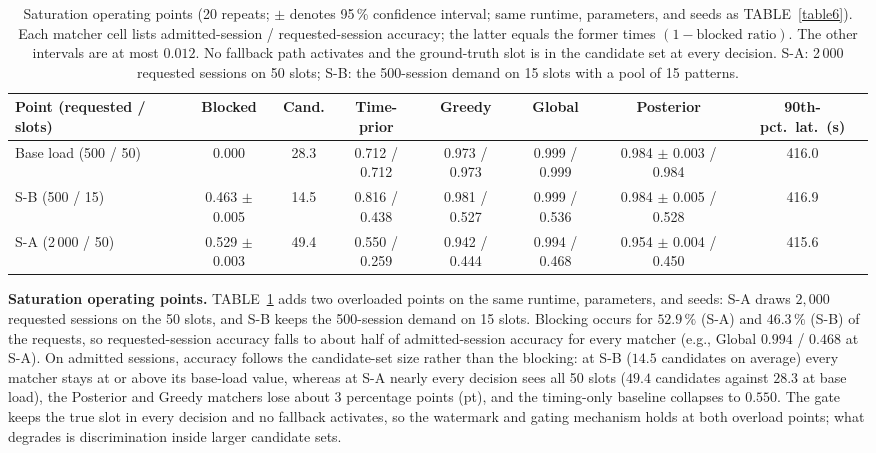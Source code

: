 \documentclass{ieeeaccess}
\newif\ifhighlight \highlightfalse
\DeclareRobustCommand{\revised}[1]{\ifhighlight{\color{blue}#1}\else{\color{.}#1}\fi}
\begin{document}
    \begin{table}[t!]
        \caption{\revised{Saturation operating points (20 repeats; $\pm$ denotes 95\,\% confidence interval; same runtime, parameters, and seeds as TABLE~\ref{table6}). Each matcher cell lists admitted-session / requested-session accuracy; the latter equals the former times $(1 - \text{blocked ratio})$. The other intervals are at most $0.012$. No fallback path activates and the ground-truth slot is in the candidate set at every decision. S-A: 2\,000 requested sessions on 50 slots; S-B: the 500-session demand on 15 slots with a pool of 15 patterns.}}
        \label{table:saturation}
        \centering
        \scriptsize
        \setlength{\tabcolsep}{3pt}
        \revised{\begin{tabular}{lccccccc}
            \toprule
            \textbf{Point (requested / slots)} & \textbf{Blocked} & \textbf{Cand.} & \textbf{Time-prior} & \textbf{Greedy} & \textbf{Global} & \textbf{Posterior} & \textbf{90th-pct.\ lat.\ (s)} \\
            \midrule
            Base load (500 / 50) & 0.000 & 28.3 & 0.712 / 0.712 & 0.973 / 0.973 & 0.999 / 0.999 & 0.984 $\pm$ 0.003 / 0.984 & 416.0 \\
            S-B (500 / 15) & 0.463 $\pm$ 0.005 & 14.5 & 0.816 / 0.438 & 0.981 / 0.527 & 0.999 / 0.536 & 0.984 $\pm$ 0.005 / 0.528 & 416.9 \\
            S-A (2\,000 / 50) & 0.529 $\pm$ 0.003 & 49.4 & 0.550 / 0.259 & 0.942 / 0.444 & 0.994 / 0.468 & 0.954 $\pm$ 0.004 / 0.450 & 415.6 \\
            \bottomrule
        \end{tabular}}
    \end{table}

    \revised{\textbf{Saturation operating points.}
    TABLE~\ref{table:saturation} adds two overloaded points on the same runtime, parameters, and seeds: S-A draws $2{,}000$ requested sessions on the 50 slots, and S-B keeps the 500-session demand on 15 slots.
    Blocking occurs for $52.9\,\%$ (S-A) and $46.3\,\%$ (S-B) of the requests, so requested-session accuracy falls to about half of admitted-session accuracy for every matcher (e.g., Global $0.994$ / $0.468$ at S-A).
    On admitted sessions, accuracy follows the candidate-set size rather than the blocking: at S-B ($14.5$ candidates on average) every matcher stays at or above its base-load value, whereas at S-A nearly every decision sees all 50 slots ($49.4$ candidates against $28.3$ at base load), the Posterior and Greedy matchers lose about 3 percentage points (pt), and the timing-only baseline collapses to $0.550$.
    The gate keeps the true slot in every decision and no fallback activates, so the watermark and gating mechanism holds at both overload points; what degrades is discrimination inside larger candidate sets.}
\end{document}
